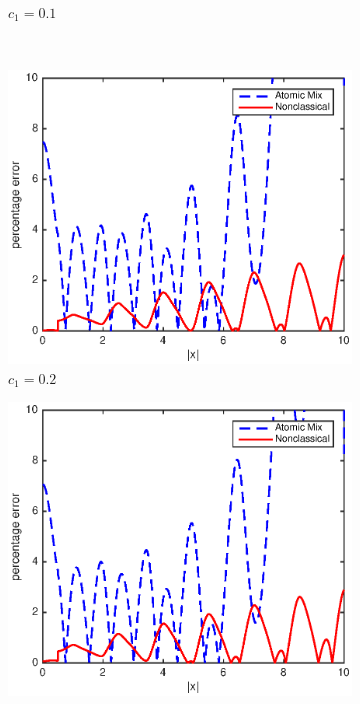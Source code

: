 \documentclass[12pt]{article}
\begin{document}
\begin{figure}[p]
\begin{subfigure}{0.495\textwidth}
        \caption{$c_1 = 0.1$}
        \label{fig1b}
    \end{subfigure}
    \\
    \centering
    \begin{subfigure}{0.495\textwidth}
        \centering
        \includegraphics[width=\textwidth]{NSE_err_A20.eps}
        \caption{$c_1 = 0.2$}
        \label{fig1c}
    \end{subfigure}
    \hfill
    \begin{subfigure}{0.495\textwidth}
        \centering
        \includegraphics[width=\textwidth]{NSE_err_A30.eps}

\end{subfigure}
\end{figure}
\end{document}

